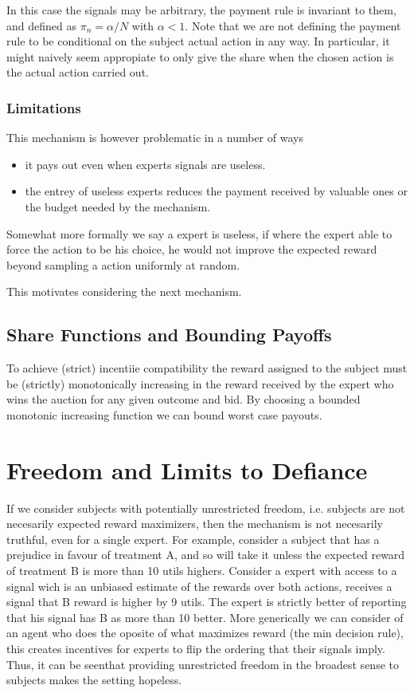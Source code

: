 In this case the signals may be arbitrary, the payment rule is invariant to them, and defined as $\pi_n  = \alpha / N $ with $\alpha < 1$. Note that we are not defining the payment rule to be conditional on the subject actual action in any way. In particular, it might naively seem appropiate to only give the share when the chosen action is the actual action carried out. 


\subsubsection{Limitations}
This mechanism is however problematic in a number of ways

\begin{itemize}
\item it pays out even when experts signals are useless.
\item the entrey of useless experts reduces the payment received by valuable ones or the budget needed by the mechanism.
\end{itemize}

Somewhat more formally we say a expert is useless, if where the expert able to force the action to be his choice, he would not improve the expected reward beyond sampling a action uniformly at random.

This motivates considering the next mechanism.



\subsection{Share Functions and Bounding Payoffs}

To achieve  (strict) incentiie compatibility the reward assigned to the subject must be (strictly) monotonically increasing in the reward received by the expert who wins the auction for any given outcome and bid. By choosing a bounded monotonic increasing function we can bound worst case payouts. 



\section{Freedom and Limits to Defiance}

If we consider subjects with potentially unrestricted freedom, i.e. subjects are not necesarily expected reward maximizers, then the mechanism is not necesarily truthful, even for a single expert. For example, consider a subject that has a prejudice in favour of treatment A, and so will take it unless the expected reward of treatment B is more than 10 utils highers. Consider a expert with access to a signal wich is an unbiased estimate of the rewards over both actions, receives a signal  that B reward is higher by 9 utils. The expert is strictly better of reporting that his signal has B as more than 10 better.
More generically we can consider of an agent who does the oposite of what maximizes reward (the min decision rule), this creates incentives for experts to flip the ordering that their signals imply. Thus, it can be seenthat providing unrestricted freedom in the broadest sense to subjects makes the setting hopeless. 

